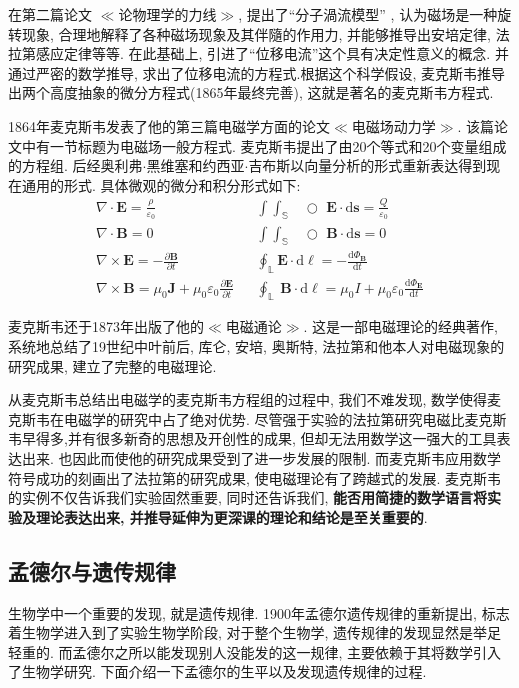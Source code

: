 \documentclass[11pt,a4paper,boxed]{caspset}
\begin{document}
在第二篇论文
$\ll$论物理学的力线$\gg$, 提出了``分子渦流模型'' , 认为磁场是一种旋转现象, 合理地解释了各种磁场现象及其伴隨的作用力, 并能够推导出安培定律, 法拉第感应定律等等.
在此基础上, 引进了``位移电流''这个具有决定性意义的概念. 并通过严密的数学推导, 求出了位移电流的方程式.根据这个科学假设, 麦克斯韦推导出两个高度抽象的微分方程式(1865年最终完善), 这就是著名的麦克斯韦方程式.

1864年麦克斯韦发表了他的第三篇电磁学方面的论文$\ll$电磁场动力学$\gg$. 该篇论文中有一节标题为电磁场一般方程式. 麦克斯韦提出了由20个等式和20个变量组成的方程组. 后经奥利弗$\cdot$黑维塞和约西亚$\cdot$吉布斯以向量分析的形式重新表达得到现在通用的形式. 具体微观的微分和积分形式如下:
\begin{eqnarray}
\nabla\cdot \mathbf{E} = \frac{\rho}{\varepsilon_0} & & \int\!\!\!\!\int_{\mathbb{S}}\!\!\!\!\!\!\!\!\!\!\!\!\!\!\;\;\;\bigcirc\,\,\mathbf E\cdot\mathrm{d}\mathbf{s} = \frac{Q}{\varepsilon_0}\nonumber\\
\nabla \cdot \mathbf{B} = 0
& &\int\!\!\!\!\int_{\mathbb{S}}\!\!\!\!\!\!\!\!\!\!\!\!\!\!\;\;\;\bigcirc\,\,\mathbf B\cdot\mathrm{d}\mathbf{s} = 0\nonumber\\
\nabla \times \mathbf{E} = - \frac{\partial \mathbf{B}} {\partial t}
& & \oint_{\mathbb{L}} \mathbf{E} \cdot \mathrm{d}\boldsymbol{\ell}= - \frac {\mathrm{d} \Phi_\mathbf{B}}{\mathrm{d} t}\nonumber\\
\nabla \times \mathbf{B} = \mu_0\mathbf{J} + \mu_0 \varepsilon_0 \frac{\partial \mathbf{E}} {\partial t} & &\oint_{\mathbb{L}}\ \mathbf{B} \cdot \mathrm{d}\boldsymbol{\ell}= \mu_0 I + \mu_0 \varepsilon_0 \frac {\mathrm{d} \Phi_\mathbf{E}}{\mathrm{d} t}\nonumber
\end{eqnarray}

麦克斯韦还于1873年出版了他的$\ll$电磁通论$\gg$.
这是一部电磁理论的经典著作, 系统地总结了19世纪中叶前后, 库仑, 安培, 奥斯特, 法拉第和他本人对电磁现象的研究成果, 建立了完整的电磁理论.

从麦克斯韦总结出电磁学的麦克斯韦方程组的过程中, 我们不难发现, 数学使得麦克斯韦在电磁学的研究中占了绝对优势. 尽管强于实验的法拉第研究电磁比麦克斯韦早得多,并有很多新奇的思想及开创性的成果, 但却无法用数学这一强大的工具表达出来. 也因此而使他的研究成果受到了进一步发展的限制. 而麦克斯韦应用数学符号成功的刻画出了法拉第的研究成果, 使电磁理论有了跨越式的发展.
麦克斯韦的实例不仅告诉我们实验固然重要, 同时还告诉我们, \textbf{能否用简捷的数学语言将实验及理论表达出来, 并推导延伸为更深课的理论和结论是至关重要的}.


\subsection{孟德尔与遗传规律}
生物学中一个重要的发现, 就是遗传规律. 1900年孟德尔遗传规律的重新提出, 标志着生物学进入到了实验生物学阶段, 对于整个生物学, 遗传规律的发现显然是举足轻重的. 而孟德尔之所以能发现别人没能发的这一规律, 主要依赖于其将数学引入了生物学研究. 下面介绍一下孟德尔的生平以及发现遗传规律的过程.
\end{document}
